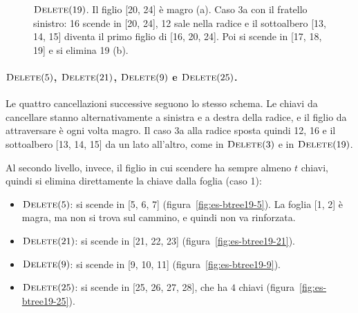 \begin{figure}[htbp]
\caption{$\textsc{Delete}(19)$. Il figlio [20, 24] è magro (a). Caso 3a con il fratello sinistro: 16 scende in [20, 24], 12 sale nella radice e il sottoalbero [13, 14, 15] diventa il primo figlio di [16, 20, 24]. Poi si scende in [17, 18, 19] e si elimina 19 (b).}
\label{fig:es-btree19-19}
\end{figure}

\paragraph{$\textsc{Delete}(5)$, $\textsc{Delete}(21)$, $\textsc{Delete}(9)$ e $\textsc{Delete}(25)$.}
Le quattro cancellazioni successive seguono lo stesso schema. Le chiavi da cancellare stanno alternativamente a sinistra e a destra della radice, e il figlio da attraversare è ogni volta magro. Il caso 3a alla radice sposta quindi 12, 16 e il sottoalbero [13, 14, 15] da un lato all'altro, come in $\textsc{Delete}(3)$ e in $\textsc{Delete}(19)$.

Al secondo livello, invece, il figlio in cui scendere ha sempre almeno $t$ chiavi, quindi si elimina direttamente la chiave dalla foglia (caso 1):
\begin{itemize}
    \item $\textsc{Delete}(5)$: si scende in [5, 6, 7] (figura~\ref{fig:es-btree19-5}). La foglia [1, 2] è magra, ma non si trova sul cammino, e quindi non va rinforzata.
    \item $\textsc{Delete}(21)$: si scende in [21, 22, 23] (figura~\ref{fig:es-btree19-21}).
    \item $\textsc{Delete}(9)$: si scende in [9, 10, 11] (figura~\ref{fig:es-btree19-9}).
    \item $\textsc{Delete}(25)$: si scende in [25, 26, 27, 28], che ha $4$ chiavi (figura~\ref{fig:es-btree19-25}).
\end{itemize}


